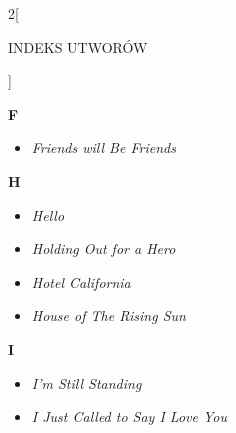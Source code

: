 \documentclass[a4paper]{report}
\begin{document}
\begin{multicols*}{2}[\begin{Huge}INDEKS UTWORÓW\end{Huge}\vspace{1cm}]
\begin{minipage}{\columnwidth}
\begin{Large}
		\textbf{F}
	\end{Large} 
	\begin{itemize}[topsep=6pt, after=\vspace{5mm}, leftmargin=0mm]
		\itemsep0em
		\item[]\textit{Friends will Be Friends}  \\
	\end{itemize}
\end{minipage}
\begin{minipage}{\columnwidth}
\begin{Large}
		\textbf{H}
	\end{Large} 
	\begin{itemize}[topsep=6pt, after=\vspace{1.5mm}, leftmargin=0mm]
		\itemsep0em
		\item[]\textit{Hello}  \\
		\item[]  \textit{Holding Out for a Hero}  \\
	\end{itemize}
\end{minipage}
\begin{minipage}{\columnwidth}
	\begin{itemize}[topsep=6pt, after=\vspace{5mm}, leftmargin=0mm]
		\itemsep0em
		\item[]  \textit{Hotel California}  \\
		\item[]  \textit{House of The Rising Sun}  \\
	\end{itemize}
\end{minipage}
\begin{minipage}{\columnwidth}
\begin{Large}
		\textbf{I}
	\end{Large} 
	\begin{itemize}[topsep=6pt, after=\vspace{1.5mm}, leftmargin=0mm]
		\itemsep0em
		\item[]\textit{I'm Still Standing}  \\
		\item[]  \textit{I Just Called to Say I Love You}  \\
	\end{itemize}

\end{minipage}
\end{multicols*}
\end{document}
